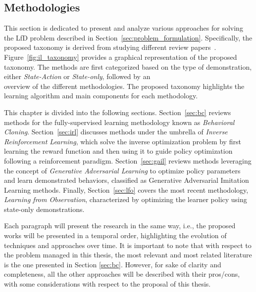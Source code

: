 \subsection{Methodologies}
\label{sec:lfd}
This section is dedicated to present and analyze various approaches for solving the LfD problem described in Section~\ref{sec:problem_formulation}. Specifically,  the proposed taxonomy is derived from studying different review papers~\cite{kaelbling1996reinforcement_survey,argall2009robot_learning_from_demonstration,hussein2017imitation_learning_survey,fang2019survey,zheng2021imitation_progress_taxonomies_opportunities,zare2024survey}. Figure~\ref{fig:il_taxonomy} provides a graphical representation of the proposed taxonomy. The methods are first categorized based on the type of demonstration, either \textit{State-Action} or \textit{State-only}, followed by an \\ overview of the different methodologies. The proposed taxonomy highlights the learning algorithm and main components for each methodology.

This chapter is divided into the following sections. Section~\ref{sec:bc} reviews methods for the fully-supervised learning methodology known as \textit{Behavioral Cloning}. 
\newline Section~\ref{sec:irl} discusses methods under the umbrella of \textit{Inverse Reinforcement Learning}, which solve the inverse optimization problem by first learning the reward function and then using it to guide policy optimization following a reinforcement paradigm.
\newline Section~\ref{sec:gail} reviews methods leveraging the concept of \textit{Generative Adversarial Learning} to optimize policy parameters and learn demonstrated behaviors, classified as Generative Adversarial Imitation Learning methods.
\newline Finally, Section~\ref{sec:lfo} covers the most recent methodology, \textit{Learning from Observation}, characterized by optimizing the learner policy using state-only demonstrations.


Each paragraph will present the research in the same way, i.e., the proposed works will be presented in a temporal order, highlighting the evolution of techniques and approaches over time.
It is important to note that with respect to the problem managed in this thesis, the most relevant and most related literature is the one presented in Section \ref{sec:bc}. However, for sake of clarity and completeness, all the other approaches will be described with their pros/cons, with some considerations with respect to the proposal of this thesis.











